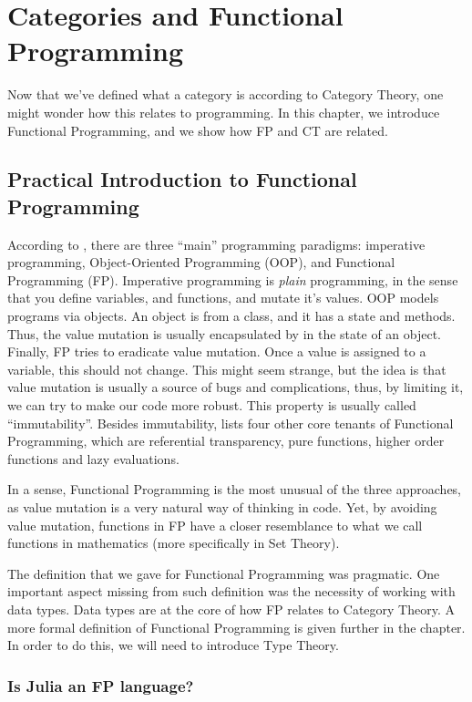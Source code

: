 \chapter{Categories and Functional Programming}

Now that we've defined what a category is according to Category Theory,
one might wonder how this relates to programming. In this chapter,
we introduce Functional Programming,
and we show how FP and CT are related.

\section{Practical Introduction to Functional Programming}

According to \citet{widman2022learning},
there are three ``main'' programming paradigms: imperative programming, Object-Oriented Programming (OOP), and Functional Programming (FP).
Imperative programming is \textit{plain} programming, in the sense that you define variables, and functions, and mutate it's values.
OOP models programs via objects. An object is from a class, and it has a state and methods. Thus, the value mutation is usually
encapsulated by in the state of an object.
Finally, FP tries to eradicate value mutation. Once a value is assigned to a variable, this should not change.
This might seem strange, but the idea is that value mutation is usually a source of bugs and complications, thus,
by limiting it, we can try to make our code more robust. This property is usually called ``immutability''.
Besides immutability, \citet{widman2022learning} lists four other core tenants of Functional Programming,
which are referential transparency,
pure functions, higher order functions and lazy evaluations.

In a sense, Functional Programming is the most unusual of the three approaches, as value mutation
is a very natural way of thinking in code. Yet, by avoiding value mutation, functions
in FP have a closer resemblance to what we call functions in mathematics (more specifically in Set Theory).

The definition that we gave for Functional Programming was pragmatic. One important
aspect missing from such definition was the necessity of working with data types.
Data types are at the core of how FP relates to Category Theory.
A more formal definition of Functional Programming is given further in the chapter.
In order to do this, we will need to introduce Type Theory.

\subsection{Is Julia an FP language?}

